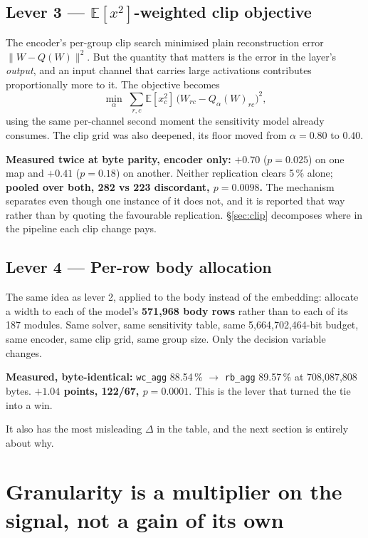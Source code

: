 \documentclass[11pt]{article}
\newcommand{\pct}{\,\%}
\newcommand{\code}[1]{\texttt{#1}}
\newcommand{\best}[1]{\textbf{#1}}
\begin{document}
\subsection{Lever 3 --- $\mathbb{E}[x^2]$-weighted clip objective}

The encoder's per-group clip search minimised plain reconstruction error
$\lVert W - Q(W) \rVert^2$. But the quantity that matters is the error in the layer's
\emph{output}, and an input channel that carries large activations contributes proportionally
more to it. The objective becomes
\[
\min_{\alpha} \; \sum_{r,c} \mathbb{E}[x_c^2]\,\bigl(W_{rc} - Q_\alpha(W)_{rc}\bigr)^2 ,
\]
using the same per-channel second moment the sensitivity model already consumes. The clip grid was
also deepened, its floor moved from $\alpha = 0.80$ to $0.40$.

\textbf{Measured twice at byte parity, encoder only:} $+0.70$ ($p = 0.025$) on one map and
$+0.41$ ($p = 0.18$) on another. Neither replication clears 5\pct{} alone; \textbf{pooled over both,
282 vs 223 discordant, $p = 0.0098$.} The mechanism separates even though one instance of it does
not, and it is reported that way rather than by quoting the favourable replication.
\S\ref{sec:clip} decomposes where in the pipeline each clip change pays.

\subsection{Lever 4 --- Per-row body allocation}

The same idea as lever 2, applied to the body instead of the embedding: allocate a width to each
of the model's \textbf{571{,}968 body rows} rather than to each of its 187 modules. Same solver,
same sensitivity table, same 5{,}664{,}702{,}464-bit budget, same encoder, same clip grid, same
group size. Only the decision variable changes.

\textbf{Measured, byte-identical:} \code{wc\_agg} 88.54\pct{} $\to$ \code{rb\_agg} 89.57\pct{} at
708{,}087{,}808 bytes. \best{$+1.04$ points, 122/67, $p = 0.0001$}. This is the lever that turned
the tie into a win.

It also has the most misleading $\Delta$ in the table, and the next section is entirely about why.

\section{Granularity is a multiplier on the signal, not a gain of its own}
\label{sec:granularity}
\end{document}
